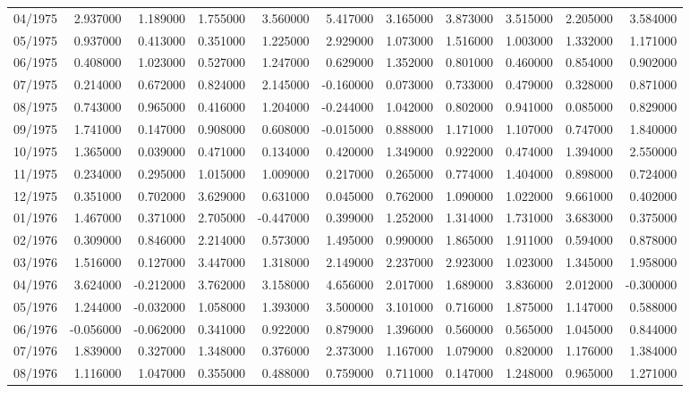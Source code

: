 \begin{tabular}{lrrrrrrrrrr}
04/1975 & 2.937000 & 1.189000 & 1.755000 & 3.560000 & 5.417000 & 3.165000 & 3.873000 & 3.515000 & 2.205000 & 3.584000 \\
05/1975 & 0.937000 & 0.413000 & 0.351000 & 1.225000 & 2.929000 & 1.073000 & 1.516000 & 1.003000 & 1.332000 & 1.171000 \\
06/1975 & 0.408000 & 1.023000 & 0.527000 & 1.247000 & 0.629000 & 1.352000 & 0.801000 & 0.460000 & 0.854000 & 0.902000 \\
07/1975 & 0.214000 & 0.672000 & 0.824000 & 2.145000 & -0.160000 & 0.073000 & 0.733000 & 0.479000 & 0.328000 & 0.871000 \\
08/1975 & 0.743000 & 0.965000 & 0.416000 & 1.204000 & -0.244000 & 1.042000 & 0.802000 & 0.941000 & 0.085000 & 0.829000 \\
09/1975 & 1.741000 & 0.147000 & 0.908000 & 0.608000 & -0.015000 & 0.888000 & 1.171000 & 1.107000 & 0.747000 & 1.840000 \\
10/1975 & 1.365000 & 0.039000 & 0.471000 & 0.134000 & 0.420000 & 1.349000 & 0.922000 & 0.474000 & 1.394000 & 2.550000 \\
11/1975 & 0.234000 & 0.295000 & 1.015000 & 1.009000 & 0.217000 & 0.265000 & 0.774000 & 1.404000 & 0.898000 & 0.724000 \\
12/1975 & 0.351000 & 0.702000 & 3.629000 & 0.631000 & 0.045000 & 0.762000 & 1.090000 & 1.022000 & 9.661000 & 0.402000 \\
01/1976 & 1.467000 & 0.371000 & 2.705000 & -0.447000 & 0.399000 & 1.252000 & 1.314000 & 1.731000 & 3.683000 & 0.375000 \\
02/1976 & 0.309000 & 0.846000 & 2.214000 & 0.573000 & 1.495000 & 0.990000 & 1.865000 & 1.911000 & 0.594000 & 0.878000 \\
03/1976 & 1.516000 & 0.127000 & 3.447000 & 1.318000 & 2.149000 & 2.237000 & 2.923000 & 1.023000 & 1.345000 & 1.958000 \\
04/1976 & 3.624000 & -0.212000 & 3.762000 & 3.158000 & 4.656000 & 2.017000 & 1.689000 & 3.836000 & 2.012000 & -0.300000 \\
05/1976 & 1.244000 & -0.032000 & 1.058000 & 1.393000 & 3.500000 & 3.101000 & 0.716000 & 1.875000 & 1.147000 & 0.588000 \\
06/1976 & -0.056000 & -0.062000 & 0.341000 & 0.922000 & 0.879000 & 1.396000 & 0.560000 & 0.565000 & 1.045000 & 0.844000 \\
07/1976 & 1.839000 & 0.327000 & 1.348000 & 0.376000 & 2.373000 & 1.167000 & 1.079000 & 0.820000 & 1.176000 & 1.384000 \\
08/1976 & 1.116000 & 1.047000 & 0.355000 & 0.488000 & 0.759000 & 0.711000 & 0.147000 & 1.248000 & 0.965000 & 1.271000 \\

\end{tabular}
